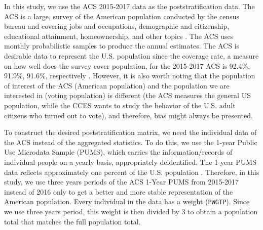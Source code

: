 \documentclass{monashthesis}
\begin{document}
In this study, we use the ACS 2015-2017 data as the poststratification data. The ACS is a large, survey of the American population conducted by the census bureau and covering jobs and occupations, demographic and citizenship, educational attainment, homeownership, and other topics \autocite{acs_data_about}. The ACS uses monthly probabilistic samples to produce the annual estimates. The ACS is desirable data to represent the U.S. population since the coverage rate, a measure on how well does the survey cover population, for the 2015-2017 ACS is 92.4\%, 91.9\%, 91.6\%, respectively \autocite{acs_coverage_rate}. However, it is also worth noting that the population of interest of the ACS (American population) and the population we are interested in (voting population) is different (the ACS measures the general US population, while the CCES wants to study the behavior of the U.S. adult citizens who turned out to vote), and therefore, bias might always be presented.

To construct the desired poststratification matrix, we need the individual data of the ACS instead of the aggregated statistics. To do this, we use the 1-year Public Use Microdata Sample (PUMS), which carries the information/records of individual people on a yearly basis, appropriately deidentified. The 1-year PUMS data reflects approximately one percent of the U.S. population \autocite{pums_metadata}. Therefore, in this study, we use three years periods of the ACS 1-Year PUMS from 2015-2017 instead of 2016 only to get a better and more stable representation of the American population. Every individual in the data has a weight (\texttt{PWGTP}). Since we use three years period, this weight is then divided by 3 to obtain a population total that matches the full population total.
\end{document}
